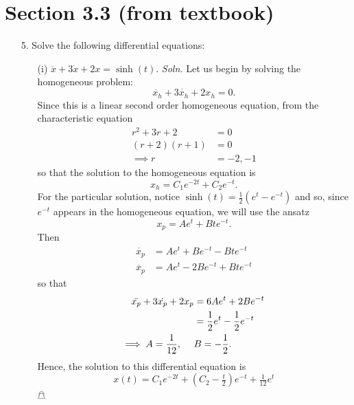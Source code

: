 \documentclass{article}
\begin{document}
\section*{Section 3.3 (from textbook)}
\begin{itemize}
    \item[5.] Solve the following differential equations:
    \begin{itemize}
        \item[(i)] $\ddot{x} + 3\dot{x} + 2x = \sinh(t)$.
        \newline\newline
        \textit{Soln.} Let us begin by solving the homogeneous problem:
        \[\ddot{x_h} + 3\dot{x_h} + 2x_h = 0.\]
        Since this is a linear second order homogeneous equation, from the characteristic equation
        \begin{align*}
            r^2 + 3r + 2 &= 0\\
            (r + 2)(r + 1) &= 0\\
            \implies r &= -2,-1
        \end{align*}
        so that the solution to the homogeneous equation is
        \[x_h = C_1e^{-2t} + C_2e^{-t}.\]
        For the particular solution, notice $\sinh(t) = \tfrac{1}{2}(e^t - e^{-t})$ and so, since $e^{-t}$ appears in the homogeneous equation, we will use the ansatz
        \[x_p = Ae^t + Bte^{-t}.\]
        Then
        \begin{align*}
            \dot{x_p} &= Ae^t + Be^{-t} - Bte^{-t}\\
            \ddot{x_p} &= Ae^t - 2Be^{-t} + Bte^{-t}
        \end{align*}
        so that
        \begin{align*}
            \ddot{x_p} + 3\dot{x_p} + 2x_p &= 6Ae^t + 2Be^{-t}\\
            &= \frac{1}{2}e^t - \frac{1}{2}e^{-t}\\
            \implies A = \frac{1}{12}, \hspace{0.5cm}& B = -\frac{1}{2}.
        \end{align*}
        Hence, the solution to this differential equation is
        \[x(t) = C_1e^{-2t} + (C_2 - \tfrac{t}{2})e^{-t} + \tfrac{1}{12}e^t\]
        \hfill $\mathghost$



\end{itemize}
\end{itemize}
\end{document}
